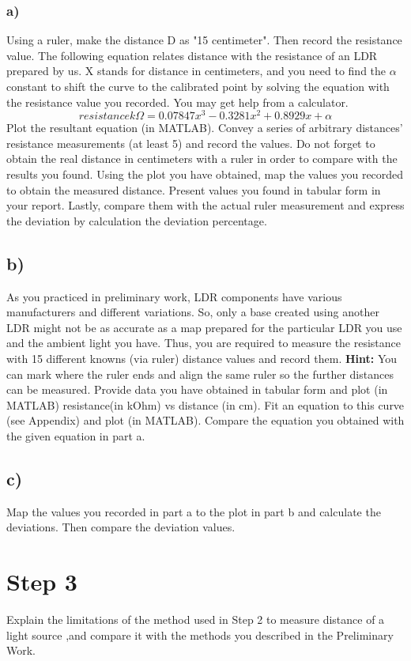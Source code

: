 \documentclass[letterpaper,12pt]{article}
\begin{document}
\subsubsection*{a)}
Using a ruler, make the distance D as "15 centimeter". Then record the resistance value. The following equation relates distance with the resistance of an LDR prepared by us. X stands for distance in centimeters, and you need to find the \(\alpha\) constant to shift the curve to the calibrated point by solving the equation with the resistance value you recorded. You may get help from a calculator.
\[resistance   k\Omega = 0.07847 x^3 -0.3281 x^2 + 0.8929x + \alpha\] 
Plot the resultant equation (in MATLAB). Convey a series of arbitrary distances' resistance measurements (at least 5) and record the values. Do not forget to obtain the real distance in centimeters with a ruler in order to compare with the results you found. Using the plot you have obtained, map the values you recorded to obtain the measured distance. Present values you found in tabular form in your report. Lastly, compare them with the actual ruler measurement and express the deviation by calculation the deviation percentage.\\
\subsection*{b)}
As you practiced in preliminary work, LDR components have various manufacturers and different variations. So, only a base created using another LDR might not be as accurate as a map prepared for the particular LDR you use and the ambient light you have. Thus, you are required to measure the resistance with 15 different knowns (via ruler) distance values and record them. \textbf{Hint:} You can mark where the ruler ends and align the same ruler so the further distances can be measured. Provide data you have obtained in tabular form and plot (in MATLAB) resistance(in kOhm) vs distance (in cm). Fit an equation to this curve (see Appendix) and plot (in MATLAB). Compare the equation you obtained with the given equation in part a. 
\subsection*{c)}
Map the values you recorded in part a to the plot in part b and calculate the deviations. Then compare the deviation values.
\section*{Step 3} 
Explain the limitations of the method used in Step 2 to measure distance of a light source ,and compare it with the methods you described in the Preliminary Work.
\end{document}
